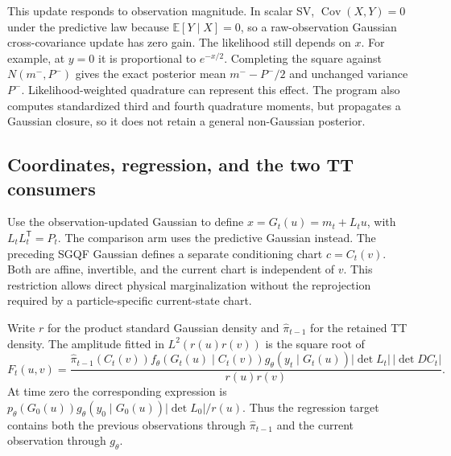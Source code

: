 \documentclass[11pt]{article}
\begin{document}
This update responds to observation magnitude. In scalar SV,
$\operatorname{Cov}(X,Y)=0$ under the predictive law because
$\mathbb E[Y\mid X]=0$, so a raw-observation Gaussian cross-covariance update
has zero gain. The likelihood still depends on $x$. For example, at $y=0$
it is proportional to $e^{-x/2}$. Completing the square against
$N(m^-,P^-)$ gives the exact posterior mean $m^--P^-/2$ and unchanged variance
$P^-$. Likelihood-weighted quadrature can represent this effect. The program
also computes standardized third and fourth quadrature moments, but propagates
a Gaussian closure, so it does not retain a general non-Gaussian posterior.

\subsection{Coordinates, regression, and the two TT consumers}

Use the observation-updated Gaussian to define
$x=G_t(u)=m_t+L_tu$, with $L_tL_t^{\mathsf T}=P_t$. The comparison arm uses
the predictive Gaussian instead. The preceding SGQF Gaussian defines a
separate conditioning chart $c=C_t(v)$. Both are affine, invertible, and the
current chart is independent of $v$. This restriction allows direct physical
marginalization without the reprojection required by a particle-specific
current-state chart.

Write $r$ for the product standard Gaussian density and
$\widehat\pi_{t-1}$ for the retained TT density. The amplitude fitted in
$L^2(r(u)r(v))$ is the square root of
\begin{equation}
 F_t(u,v)=\frac{\widehat\pi_{t-1}(C_t(v))
 f_\theta(G_t(u)\mid C_t(v))g_\theta(y_t\mid G_t(u))
 |\det L_t|\,|\det DC_t|}{r(u)r(v)}.
 \label{eq:exec-pullback}
\end{equation}
At time zero the corresponding expression is
$p_\theta(G_0(u))g_\theta(y_0\mid G_0(u))|\det L_0|/r(u)$.
Thus the regression target contains both the previous observations through
$\widehat\pi_{t-1}$ and the current observation through $g_\theta$.
\end{document}
